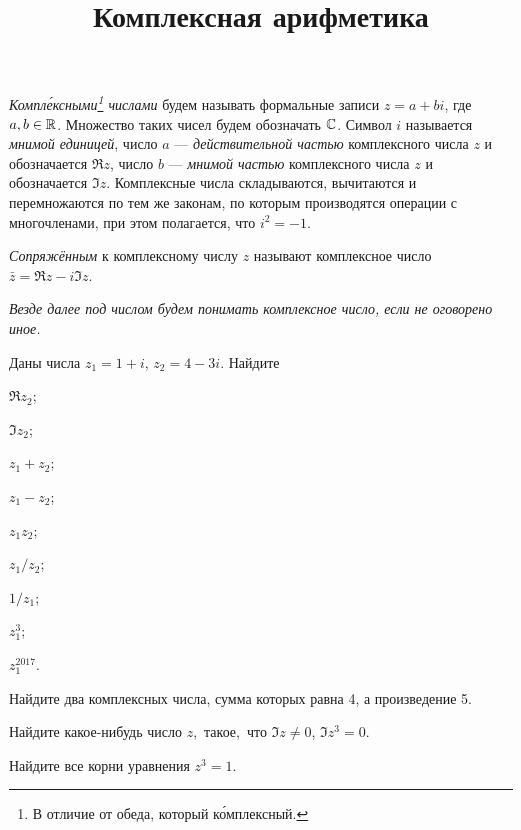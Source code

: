 \documentclass[a4paper, 12pt, num=21]{listok}
\begin{document}
\title{Комплексная арифметика}
\maketitle{}
\begin{definition}
	\textit{Компл\'ексными\footnote{В отличие от обеда, который к\'омплексный.} числами} будем называть формальные записи $z = a + b i$, где $a, b \in \mathbb{R}$.
	Множество таких чисел будем обозначать $\mathbb{C}$.
	Символ $i$ называется \textit{мнимой единицей}, число $a$ --- \textit{действительной частью} комплексного числа $z$ и обозначается $\Re z$,
	число $b$ --- \textit{мнимой частью} комплексного числа $z$ и обозначается $\Im z$.
	Комплексные числа складываются, вычитаются и перемножаются по тем же законам, по которым производятся операции с
	многочленами, при этом полагается, что $i^2 = -1$.
\end{definition}
\begin{definition}
	\textit{Сопряжённым} к комплексному числу $z$ называют комплексное число $\bar{z} = \Re z - i \Im z$.
\end{definition}
\textit{Везде далее под числом будем понимать комплексное число, если не оговорено иное.}
\begin{problem}
Даны числа $z_1 = 1 + i$, $z_2 = 4 - 3i$.
Найдите
\begin{multienum}{5}
	\item $\Re z_2$;
	\item $\Im z_2$;
	\item $z_1 + z_2$;
	\item $z_1 - z_2$;
	\item $z_1z_2$;
	\item $z_1/z_2$;
	\item $1/z_1$;
	\item $z_1^3$;
	\item $z_1^{2017}$.
\end{multienum}
\end{problem}
\begin{problem}
	Найдите два комплексных числа, сумма которых равна 4, а произведение 5.
\end{problem}
\begin{problem}
\begin{probparts}
	\item Найдите какое-нибудь число $z$,~такое,~что $\Im z \ne 0$, $\Im z^3 = 0$.
	\item Найдите все корни уравнения $z^3 = 1$.
\end{probparts}
\end{problem}
\end{document}
